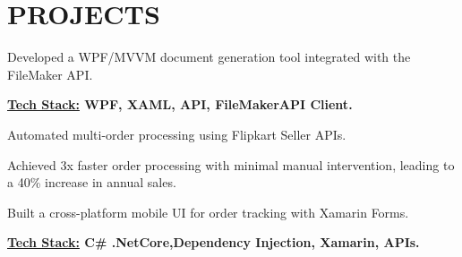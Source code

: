 \documentclass[]{deedy-resume-openfont}
\begin{document}
\begin{minipage}[t]{0.66\textwidth}

\section{PROJECTS}

\begin{tightemize}
\item Developed a WPF/MVVM document generation tool integrated with the FileMaker API.
\item \textbf{ \underline{Tech Stack:} WPF, XAML, API, FileMakerAPI Client.}
\end{tightemize}
\sectionsep

\begin{tightemize}
\item Automated multi-order processing using Flipkart Seller APIs.
\item Achieved 3x faster order processing with minimal manual intervention, leading to a 40\% increase in annual sales.
\item Built a cross-platform mobile UI for order tracking with Xamarin Forms.
\item \textbf{ \underline{Tech Stack:} C\# .NetCore,Dependency Injection, Xamarin, APIs.}
\end{tightemize}
\sectionsep

\end{minipage}
\end{document}
